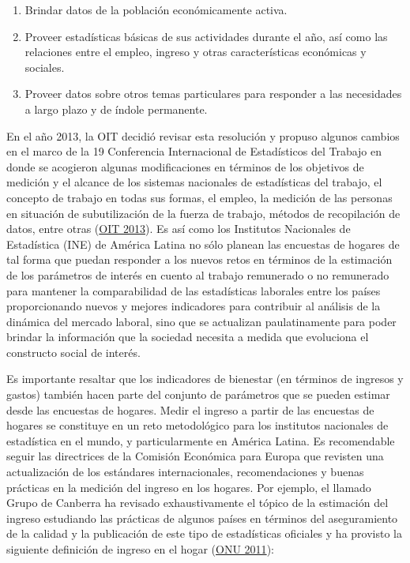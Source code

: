 \documentclass[
  12pt,
  spanish,
]{book}
\providecommand{\tightlist}{%
  \setlength{\itemsep}{0pt}\setlength{\parskip}{0pt}}
\begin{document}
\begin{enumerate}
\def\labelenumi{\arabic{enumi}.}
\tightlist
\item
  Brindar datos de la población económicamente activa.
\item
  Proveer estadísticas básicas de sus actividades durante el año, así como las relaciones entre el empleo, ingreso y otras características económicas y sociales.
\item
  Proveer datos sobre otros temas particulares para responder a las necesidades a largo plazo y de índole permanente.
\end{enumerate}

En el año 2013, la OIT decidió revisar esta resolución y propuso algunos cambios en el marco de la 19 Conferencia Internacional de Estadísticos del Trabajo en donde se acogieron algunas modificaciones en términos de los objetivos de medición y el alcance de los sistemas nacionales de estadísticas del trabajo, el concepto de trabajo en todas sus formas, el empleo, la medición de las personas en situación de subutilización de la fuerza de trabajo, métodos de recopilación de datos, entre otras (\protect\hyperlink{ref-OIT_2013}{OIT 2013}). Es así como los Institutos Nacionales de Estadística (INE) de América Latina no sólo planean las encuestas de hogares de tal forma que puedan responder a los nuevos retos en términos de la estimación de los parámetros de interés en cuento al trabajo remunerado o no remunerado para mantener la comparabilidad de las estadísticas laborales entre los países proporcionando nuevos y mejores indicadores para contribuir al análisis de la dinámica del mercado laboral, sino que se actualizan paulatinamente para poder brindar la información que la sociedad necesita a medida que evoluciona el constructo social de interés.

Es importante resaltar que los indicadores de bienestar (en términos de ingresos y gastos) también hacen parte del conjunto de parámetros que se pueden estimar desde las encuestas de hogares. Medir el ingreso a partir de las encuestas de hogares se constituye en un reto metodológico para los institutos nacionales de estadística en el mundo, y particularmente en América Latina. Es recomendable seguir las directrices de la Comisión Económica para Europa que revisten una actualización de los estándares internacionales, recomendaciones y buenas prácticas en la medición del ingreso en los hogares. Por ejemplo, el llamado Grupo de Canberra ha revisado exhaustivamente el tópico de la estimación del ingreso estudiando las prácticas de algunos países en términos del aseguramiento de la calidad y la publicación de este tipo de estadísticas oficiales y ha provisto la siguiente definición de ingreso en el hogar (\protect\hyperlink{ref-United-Nations_2011}{ONU 2011}):
\end{document}
